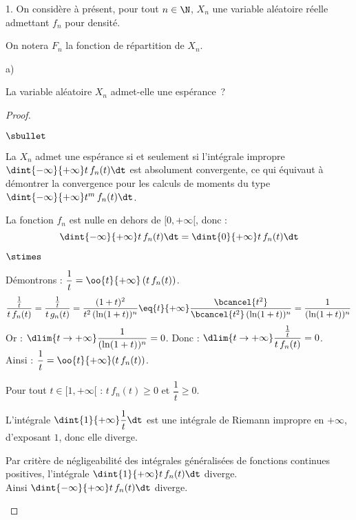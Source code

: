 \documentclass[11pt]{article}%
\begin{document}
\begin{noliste}{1.}
\noindent \hspace{-0.5cm} On considère à présent, pour tout $n \in 
\N$, $X_n$ une variable aléatoire réelle admettant $f_n$ pour 
densité.

\noindent \hspace{-0.5cm} On notera $F_n$ la fonction de répartition de 
$X_n$.

\begin{noliste}{a)}
\setcounter{enumii}{1}
\item La variable aléatoire $X_n$ admet-elle une espérance~?

\begin{proof}~
 \begin{noliste}{$\sbullet$}
 \item La \var $X_n$ admet une espérance si et seulement si
   l'intégrale impropre $\dint{-\infty}{+\infty} t \, f_n(t) \dt$ est
   absolument convergente, ce qui équivaut à démontrer la convergence
   pour les calculs de moments du type $\dint{-\infty}{+\infty} t^m \,
   f_n(t) \dt$.
  
  \item La fonction $f_n$ est nulle en dehors de $[0,+\infty[$, donc : 
  \[
   \dint{-\infty}{+\infty} t \, f_n(t) \dt = 
   \dint{0}{+\infty} t \, f_n(t) \dt
  \]
  
\item
  \begin{noliste}{$\stimes$}
  \item Démontrons : $\dfrac{1}{t} = \oo{t}{+\infty} \left( t\, f_n(t)
    \right)$.
    \[
     \dfrac{\frac{1}{t}}{t\, f_n(t)} =
     \dfrac{\frac{1}{t}}{t\, g_n(t)}= \dfrac{(1+t)^2}{t^2 \, 
     (\ln(1+t))^n} \eq{t}{+\infty} \dfrac{\bcancel{t^2}}
     {\bcancel{t^2} \, (\ln(1+t))^n} = \dfrac{1}{(\ln(1+t))^n}
    \]
    Or : $\dlim{t\to +\infty} \dfrac{1}{(\ln(1+t))^n} =0$. Donc :
    $\dlim{t\to+\infty} \dfrac{\frac{1}{t}}{t\, f_n(t)}=0$.\\[.2cm]
    Ainsi : $\dfrac{1}{t} = \oo{t}{+\infty} (t\, f_n(t))$.


    \newpage


  \item Pour tout $t\in [1,+\infty[$ : $t\, f_n(t) \geq 0$ et
    $\dfrac{1}{t} \geq 0$.
    
    \item L'intégrale $\dint{1}{+\infty} \dfrac{1}{t} \dt$ est une 
    intégrale de Riemann impropre en $+\infty$, d'exposant $1$, donc 
    elle diverge.
  \end{noliste}
  Par critère de négligeabilité des intégrales généralisées de
  fonctions continues positives, l'intégrale $\dint{1}{+\infty} t\,
  f_n(t) \dt$ diverge.\\[.2cm]
  Ainsi $\dint{-\infty}{+\infty} t \, f_n(t) \dt$ diverge.
 \end{noliste}


\end{proof}
\end{noliste}
\end{noliste}
\end{document}
